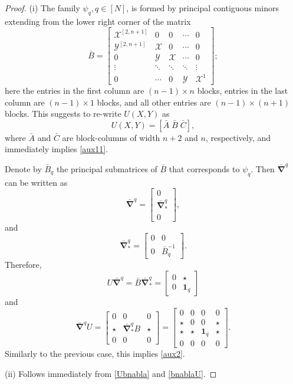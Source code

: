 \documentclass{amsart}
\theoremstyle{definition}
\theoremstyle{remark}
\numberwithin{equation}{section}
\numberwithin{theorem}{section}
\begin{document}
\begin{proof}
(i) The family ${{\psi}}_q,  q\in [N]$, is formed by principal contiguous minors
extending from the lower right 
corner of the matrix 
\[
\bar B = \left [
\begin{array}{ccccc}
{{\mathcal X}}^{[2,n+1]} & 0 & 0 & \cdots & 0 \\
{{\mathcal Y}}^{[2,n+1]} & {{\mathcal X}} & 0 &\cdots & 0  \\
0 &{{\mathcal Y}} &{{\mathcal X}} &\cdots & 0\\
\vdots& \ddots& \ddots &\ddots &\vdots \\
0 & \cdots & 0 &  {{\mathcal Y}} & {{\mathcal X}}^1
\end{array}
\right ]; 
\]
here the entries in the first column are $(n-1)\times n$ blocks, entries in the last
column are $(n-1)\times 1$
blocks, and all other entries are $(n-1)\times (n+1)$ blocks. This 
suggests to re-write $U(X,Y)$ as
$$
U(X,Y)= \left [ \bar A \;\bar B \;\bar C \right ],
$$
where $\bar A$ 
and $\bar C$ 
are block-columns of width $n+2$ and $n$, respectively, and immediately implies
\eqref{aux11}.

Denote by $\bar B_q$ the principal submatrices of $\bar B$  that corresponds to
${{\psi}}_q$. Then
$\bar{\boldsymbol\nabla}^q$ can be written as
\[
\bar{\boldsymbol\nabla}^q=\left [\begin{array}{c} 0\\\bar {\boldsymbol\nabla}^q_*\\ 0 \end{array}\right ],
\]
 and
$$
\bar{\boldsymbol\nabla}^q_* = \left [\begin{array}{cc} 0 & 0 \\ 0  & \bar B_q^{-1}
\end{array}\right ].
$$
Therefore, 
\begin{equation}\label{Ubnabla}
U \bar{\boldsymbol\nabla}^q = \bar B \bar{\boldsymbol\nabla}^q_* = 
\left [\begin{array}{cc} 0 & \star \\ 0  & {\mathbf 1}_q \end{array}\right ] 
\end{equation}
and
\begin{equation}\label{bnablaU}
\bar{\boldsymbol\nabla}^q U=\left [\begin{array}{ccc} 0 & 0 & 0\\ 
\star & \bar{\boldsymbol\nabla}^q_* B & \star \\ 0 & 0 & 0 \end{array}\right ] =
\left [\begin{array}{cccc} 0& 0 & 0  & 0\\ 
\star & 0 & 0 & \star \\ \star & \star & {\mathbf 1}_q & \star\\
0& 0 & 0  & 0
\end{array}\right ].
\end{equation}
Similarly to the previous case, this implies \eqref{aux2}.

(ii) Follows immediately from \eqref{Ubnabla} and \eqref{bnablaU}.
\end{proof}
\end{document}
